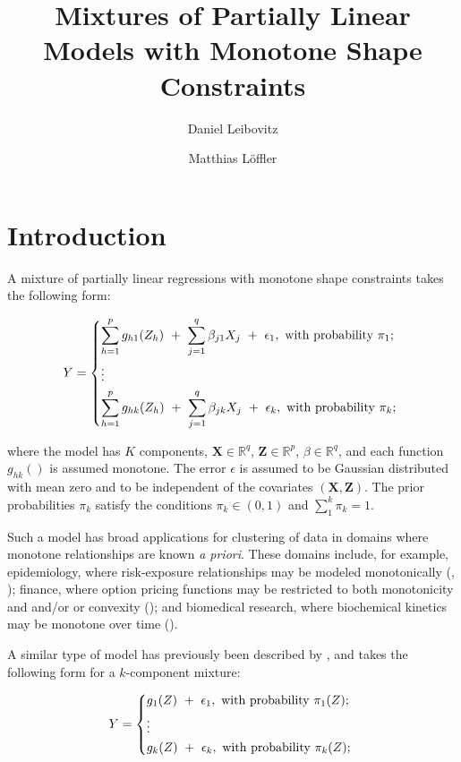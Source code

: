 \documentclass[10pt]{olplainarticle}\usepackage[]{graphicx}\usepackage[]{color}
\title{Mixtures of Partially Linear Models with Monotone Shape Constraints}
\author[1]{Daniel Leibovitz}
\author[2]{Matthias L{\"o}ffler}
\affil[1]{daniel.leibovitz@uzh.ch}
\affil[2]{matthias.loeffler@stat.math.ethz.ch}
\begin{document}
\flushbottom
\maketitle
\thispagestyle{empty}

\section{Introduction}

A mixture of partially linear regressions with monotone shape constraints takes the following form:

\begin{equation} \label{modstrucbrief}
  Y = 
  \begin{dcases}
    \sum_{h=1}^{p} g_{h1} (Z_{h}) \ +\  \sum_{j=1}^{q} \beta_{j1} X_{j} \ +\ \epsilon_1, \text{  with probability $\pi_1$; }\\
    \vdots \\
    \sum_{h=1}^{p} g_{hk} (Z_{h}) \ +\  \sum_{j=1}^{q} \beta_{jk} X_{j} \ +\ \epsilon_k, \text{  with probability $\pi_k$; } \\
  \end{dcases}
\end{equation}

where the model has $K$ components, $\boldsymbol{X} \in \mathbb{R}^q$, $\boldsymbol{Z} \in \mathbb{R}^p$, $\beta \in \mathbb{R}^q$, and each function $g_{hk}()$ is assumed monotone. The error $\epsilon$ is assumed to be Gaussian distributed with mean zero and to be independent of the covariates $(\boldsymbol{X}, \boldsymbol{Z})$. The prior probabilities $\pi_k$ satisfy the conditions $\pi_k \in (0,1)$ and $\sum_{1}^{k} \pi_k = 1$.

Such a model has broad applications for clustering of data in domains where monotone relationships are known \emph{a priori}. These domains include, for example, epidemiology, where risk-exposure relationships may be modeled monotonically (\cite{morton}, \cite{carcinogen}); finance, where option pricing functions may be restricted to both monotonicity and and/or or convexity (\cite{optionpricing}); and biomedical research, where biochemical kinetics may be monotone over time (\cite{kinetics}). 


A similar type of model has previously been described by \cite{zhangetal}, and takes the following form for a $k$-component mixture:

\begin{equation} \label{zhangstruc}
  Y = 
  \begin{dcases}
    g_{1} (Z) \ +\  \epsilon_1 , \text{  with probability $\pi_1(Z)$; }\\
    \vdots \\
    g_{k} (Z) \ +\  \epsilon_k , \text{  with probability $\pi_k(Z)$; }\\
  \end{dcases}
\end{equation}
\end{document}
